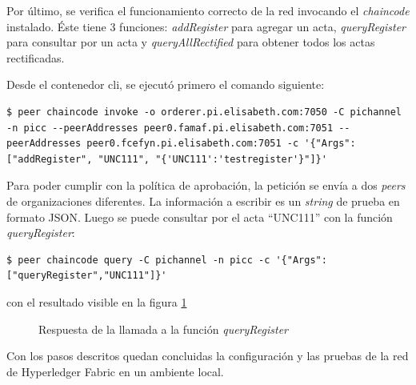 \begin{enumerate}
Por último, se verifica el funcionamiento correcto de la red invocando el \textit{chaincode} instalado. Éste tiene 3 funciones: \textit{addRegister} para agregar un acta, \textit{queryRegister} para consultar por un acta y \textit{queryAllRectified} para obtener todos los actas rectificadas.

Desde el contenedor cli, se ejecutó primero el comando siguiente:
\begin{verbatim}
$ peer chaincode invoke -o orderer.pi.elisabeth.com:7050 -C pichannel -n picc --peerAddresses peer0.famaf.pi.elisabeth.com:7051 --peerAddresses peer0.fcefyn.pi.elisabeth.com:7051 -c '{"Args":["addRegister", "UNC111", "{'UNC111':'testregister'}"]}'
\end{verbatim}
Para poder cumplir con la política de aprobación, la petición se envía a dos \textit{peers} de organizaciones diferentes. La información a escribir es un \textit{string} de prueba en formato JSON.
Luego se puede consultar por el acta ``UNC111'' con la función \textit{queryRegister}:
\begin{verbatim}
$ peer chaincode query -C pichannel -n picc -c '{"Args":["queryRegister","UNC111"]}'
\end{verbatim}
con el resultado visible en la figura \ref{fig:query_reg_call}
\begin{figure}[H]
    \caption{Respuesta de la llamada a la función \textit{queryRegister}}
    \label{fig:query_reg_call}
\end{figure}
\end{enumerate}
Con los pasos descritos quedan concluidas la configuración y las pruebas de la red de Hyperledger Fabric en un ambiente local.
